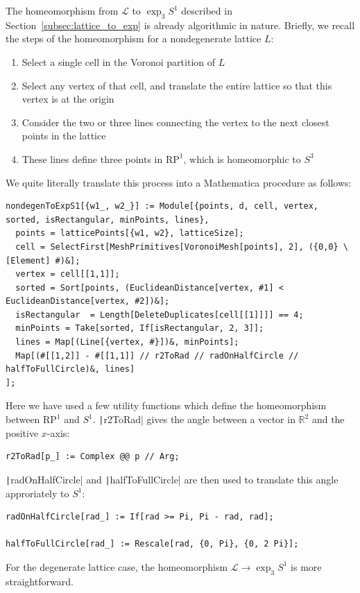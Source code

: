 \documentclass[12pt,twoside]{reedthesis}
\theoremstyle{definition}
\newcommand{\R}{\mathbb{R}}
\newcommand{\LS}{\mathcal{L}}
\begin{document}
The homeomorphism from $\LS$ to $\exp_3 S^1$ described in Section~\ref{subsec:lattice_to_exp} is already algorithmic in nature.
Briefly, we recall the steps of the homeomorphism for a nondegenerate lattice $L$:
\begin{enumerate}
  \item Select a single cell in the Voronoi partition of $L$
  \item Select any vertex of that cell, and translate the entire lattice so that this vertex is at the origin
  \item Consider the two or three lines connecting the vertex to the next closest points in the lattice
  \item These lines define three points in $\mathrm{RP}^1$, which is homeomorphic to $S^3$
\end{enumerate}
We quite literally translate this process into a Mathematica procedure as follows:
\begin{verbatim}
nondegenToExpS1[{w1_, w2_}] := Module[{points, d, cell, vertex, sorted, isRectangular, minPoints, lines},
  points = latticePoints[{w1, w2}, latticeSize];
  cell = SelectFirst[MeshPrimitives[VoronoiMesh[points], 2], ({0,0} \[Element] #)&];
  vertex = cell[[1,1]];
  sorted = Sort[points, (EuclideanDistance[vertex, #1] < EuclideanDistance[vertex, #2])&];
  isRectangular  = Length[DeleteDuplicates[cell[[1]]]] == 4;
  minPoints = Take[sorted, If[isRectangular, 2, 3]];
  lines = Map[(Line[{vertex, #}])&, minPoints];
  Map[(#[[1,2]] - #[[1,1]] // r2ToRad // radOnHalfCircle // halfToFullCircle)&, lines]
];
\end{verbatim}
Here we have used a few utility functions which define the homeomorphism between $\mathrm{RP}^1$ and $S^1$.
\texttt|r2ToRad| gives the angle between a vector in $\R^2$ and the positive $x$-axis:
\begin{verbatim}
r2ToRad[p_] := Complex @@ p // Arg;
\end{verbatim}
\texttt|radOnHalfCircle| and \texttt|halfToFullCircle| are then used to translate this angle approriately to $S^1$:
\begin{verbatim}
radOnHalfCircle[rad_] := If[rad >= Pi, Pi - rad, rad];

halfToFullCircle[rad_] := Rescale[rad, {0, Pi}, {0, 2 Pi}];
\end{verbatim}
For the degenerate lattice case, the homeomorphism $\LS \to \exp_3 S^1$ is more straightforward.
\end{document}
